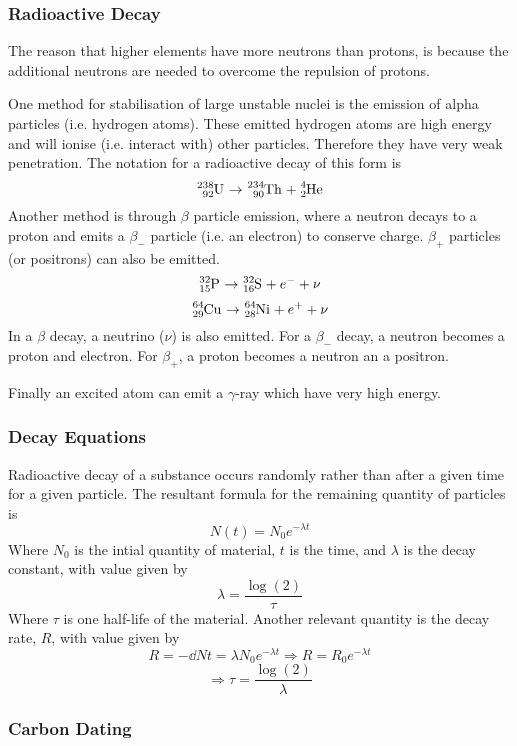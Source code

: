 \documentclass[12pt]{report}
\begin{document}
\begin{flushleft}
\subsubsection*{Radioactive Decay}

The reason that higher elements have more neutrons than protons, is because the
additional neutrons are needed to overcome the repulsion of protons. \par
One method for stabilisation of large unstable nuclei is the emission of alpha
particles (i.e. hydrogen atoms). These emitted hydrogen atoms are high energy
and will ionise (i.e. interact with) other particles. Therefore they have very
weak penetration. The notation for a radioactive decay of this form is
\[\tensor*[^{238}_{92}]{\mathrm{U}}{} \rightarrow
\tensor*[^{234}_{90}]{\mathrm{Th}}{} + \tensor*[^4_2]{\mathrm{He}}{}\]
Another method is through \(\beta\) particle emission, where a neutron decays
to a proton and emits a \(\beta_{-}\) particle (i.e. an electron) to conserve
charge. \(\beta_{+}\) particles (or positrons) can also be emitted.
\[\tensor*[^{32}_{15}]{\mathrm{P}}{} \rightarrow
\tensor*[^{32}_{16}]{\mathrm{S}}{} + e^{-} + \nu\]
\[\tensor*[^{64}_{29}]{\mathrm{Cu}}{} \rightarrow
\tensor*[^{64}_{28}]{\mathrm{Ni}}{} + e^{+} + \nu\]
In a \(\beta\) decay, a neutrino (\(\nu\)) is also emitted. For a \(\beta_-\)
decay, a neutron becomes a proton and electron. For \(\beta_+\), a proton
becomes a neutron an a positron. \par
Finally an excited atom can emit a \(\gamma\)-ray which have very high energy.

\subsubsection*{Decay Equations}

Radioactive decay of a substance occurs randomly rather than after a given time
for a given particle. The resultant formula for the remaining quantity of
particles is
\[N(t) = N_0e^{-\lambda t}\]
Where \(N_0\) is the intial quantity of material, \(t\) is the time, and
\(\lambda\) is the decay constant, with value given by
\[\lambda = \frac{\log(2)}{\tau}\]
Where \(\tau\) is one half-life of the material. Another relevant quantity is
the decay rate, \(R\), with value given by
\[R = -\dd{N}{t} = \lambda N_0e^{-\lambda t} \Rightarrow R =R_0e^{-\lambda t}\]
\[\Rightarrow \tau = \frac{\log(2)}{\lambda}\]

\subsubsection*{Carbon Dating}


\end{flushleft}
\end{document}

